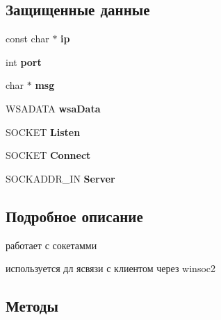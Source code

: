 \subsection*{Защищенные данные}
\begin{DoxyCompactItemize}
\item 
\mbox{\label{classc__server_a305b66761e4b9651c0ba560a1e69ef8d}} 
const char $\ast$ {\bfseries ip}
\item 
\mbox{\label{classc__server_a4d76974cc63d86fc24dbb18c4250cc43}} 
int {\bfseries port}
\item 
\mbox{\label{classc__server_a4c94800fcaaacf93d0affb17fabd7c18}} 
char $\ast$ {\bfseries msg}
\item 
\mbox{\label{classc__server_a3a7c7ff923ed0e5e3aabf5ab998809b1}} 
W\+S\+A\+D\+A\+TA {\bfseries wsa\+Data}
\item 
\mbox{\label{classc__server_a634549f8816a35a96eb90209dd2f704c}} 
S\+O\+C\+K\+ET {\bfseries Listen}
\item 
\mbox{\label{classc__server_ae0a0a62d1156f11ff3079aa4d06a25c8}} 
S\+O\+C\+K\+ET {\bfseries Connect}
\item 
\mbox{\label{classc__server_a146026c08540d34c2cdc99262b285b5f}} 
S\+O\+C\+K\+A\+D\+D\+R\+\_\+\+IN {\bfseries Server}
\end{DoxyCompactItemize}


\subsection{Подробное описание}
работает с сокетамми 

используется дл ясвязи с клиентом через winsoc2 

\subsection{Методы}
\mbox{\label{classc__server_a270ba2fdfc82bc6f21b74c6542b6f358}} 
